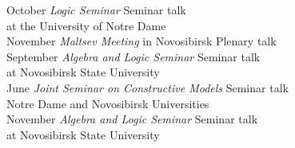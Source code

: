 \documentclass[12pt]{article}
\begin{document}
\begin{tabbing}
{October			\> {\em Logic Seminar}				\> Seminar talk\\
		\>	\> at the University of Notre Dame		\> \\
November		\> {\em Maltsev Meeting} in Novosibirsk		\> Plenary talk\\
September		\> {\em Algebra and Logic Seminar}		\> Seminar talk\\
		\>	\> at Novosibirsk State University		\> \\
June			\> {\em Joint Seminar on Constructive Models}	\> Seminar talk\\
		\>	\> Notre Dame and Novosibirsk Universities	\> \\
November		\> {\em Algebra and Logic Seminar}		\> Seminar talk\\
		\>	\> at Novosibirsk State University		\>
}{}
\end{tabbing}
\end{document}
